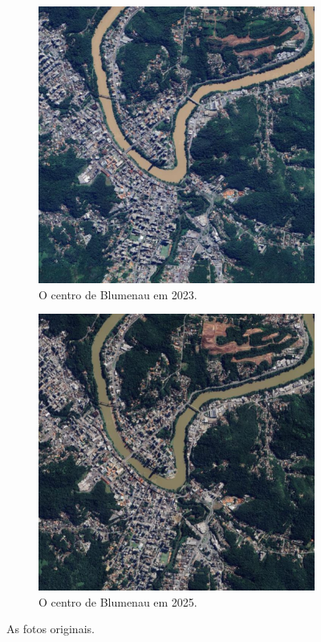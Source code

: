 \documentclass{article}
\begin{document}
\begin{figure}[H]
    \centering
    \begin{subfigure}[b]{0.48\textwidth}
        \includegraphics[width=\textwidth]{../Imagens/012023.png}
        \caption{O centro de Blumenau em 2023.}
        \label{2023}
    \end{subfigure}
    \hfill %
    \begin{subfigure}[b]{0.48\textwidth}
        \includegraphics[width=\textwidth]{../Imagens/012025.png}
        \caption{O centro de Blumenau em 2025.}
        \label{2025}
    \end{subfigure}
    \caption{As fotos originais.}
    \label{original}
\end{figure}
\end{document}
